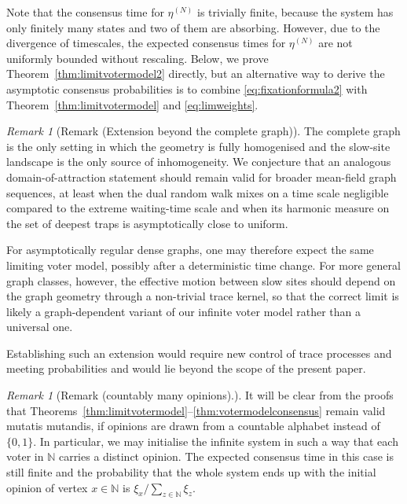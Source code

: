 \documentclass[11pt,a4paper]{scrartcl}
\numberwithin{equation}{section}
\theoremstyle{plain}
\theoremstyle{definition}
\theoremstyle{remark}
\newtheorem{remark}[theorem]{Remark}
\newcommand{\bN}{\ensuremath{\mathbb{N}}}
\begin{document}
Note that the consensus time for $\eta^{(N)}$ is trivially finite, because the system has only finitely many states and two of them are absorbing. However, due to the divergence of timescales, the expected consensus times for $\eta^{(N)}$ are not uniformly bounded without rescaling. Below, we prove Theorem~\ref{thm:limitvotermodel2} directly, but an alternative way to derive the asymptotic consensus probabilities is to combine \eqref{eq:fixationformula2} with Theorem~\ref{thm:limitvotermodel} and \eqref{eq:limweights}.  

\begin{remark}[Remark (Extension beyond the complete graph)]
The complete graph is the only setting in which the geometry is fully homogenised and the slow-site landscape is the only source of inhomogeneity. We conjecture that an analogous domain-of-attraction statement should remain valid for broader mean-field graph sequences, at least when the dual random walk mixes on a time scale negligible compared to the extreme waiting-time scale and when its harmonic measure on the set of deepest traps is asymptotically close to uniform.

For asymptotically regular dense graphs, one may therefore expect the same limiting voter model, possibly after a deterministic time change. For more general graph classes, however, the effective motion between slow sites should depend on the graph geometry through a non-trivial trace kernel, so that the correct limit is likely a graph-dependent variant of our infinite voter model rather than a universal one.

Establishing such an extension would require new control of trace processes and meeting probabilities and would lie beyond the scope of the present paper.
\end{remark}

\begin{remark}[Remark (countably many opinions).]
It will be clear from the proofs that Theorems~\ref{thm:limitvotermodel}--\ref{thm:votermodelconsensus} remain valid mutatis mutandis, if opinions are drawn from a countable alphabet instead of $\{0,1\}$. In particular, we may initialise the infinite system in such a way that each voter in $\bN$ carries a distinct opinion. The expected consensus time in this case is still finite and the probability that the whole system ends up with the initial opinion of vertex $x\in\bN$ is $\xi_x/\sum_{z\in\bN}\xi_z$.
\end{remark}
\end{document}
